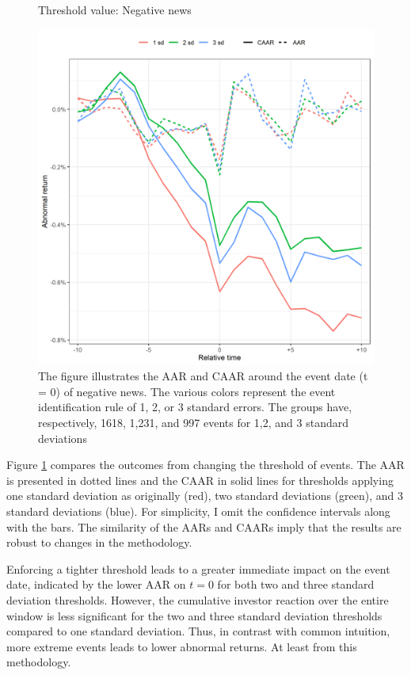 \begin{figure} [H]
    \centering
    \caption{Threshold value: Negative news}
    \includegraphics[scale=0.6]{Projekt/1.Figures analysis/ST_negative_sensitivity.png}
     \caption*{\footnotesize The figure illustrates the AAR and CAAR around the event date (t = 0) of negative news. The various colors represent the event identification rule of 1, 2, or 3 standard errors. The groups have, respectively, 1618, 1,231, and 997 events for 1,2, and 3 standard deviations}
    \label{fig:ST_neg_sensitivity}
\end{figure} 

Figure \ref{fig:ST_neg_sensitivity} compares the outcomes from changing the threshold of events. The AAR is presented in dotted lines and the CAAR in solid lines for thresholds applying one standard deviation as originally (red), two standard deviations (green), and 3 standard deviations (blue). For simplicity, I omit the confidence intervals along with the bars. The similarity of the AARs and CAARs imply that the results are robust to changes in the methodology. 

Enforcing a tighter threshold leads to a greater immediate impact on the event date, indicated by the lower AAR on $t=0$ for both two and three standard deviation thresholds. However, the cumulative investor reaction over the entire window is less significant for the two and three standard deviation thresholds compared to one standard deviation. Thus, in contrast with common intuition, more extreme events leads to lower abnormal returns. At least from this methodology. 
 

